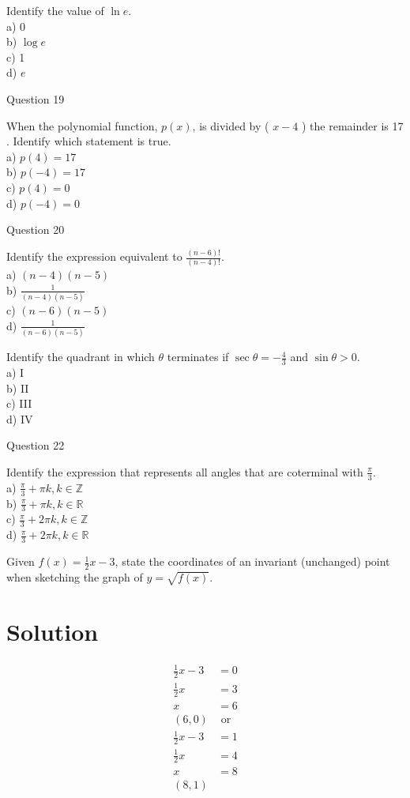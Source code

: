 \documentclass[10pt]{article}
\begin{document}
Identify the value of $\ln e$.\\
a) 0\\
b) $\log e$\\
c) 1\\
d) $e$

Question 19

When the polynomial function, $p(x)$, is divided by ( $x-4$ ) the remainder is 17 . Identify which statement is true.\\
a) $p(4)=17$\\
b) $p(-4)=17$\\
c) $p(4)=0$\\
d) $p(-4)=0$

Question 20

Identify the expression equivalent to $\frac{(n-6)!}{(n-4)!}$.\\
a) $(n-4)(n-5)$\\
b) $\frac{1}{(n-4)(n-5)}$\\
c) $(n-6)(n-5)$\\
d) $\frac{1}{(n-6)(n-5)}$

Identify the quadrant in which $\theta$ terminates if $\sec \theta=-\frac{4}{3}$ and $\sin \theta>0$.\\
a) I\\
b) II\\
c) III\\
d) IV

Question 22

Identify the expression that represents all angles that are coterminal with $\frac{\pi}{3}$.\\
a) $\frac{\pi}{3}+\pi k, k \in \mathbb{Z}$\\
b) $\frac{\pi}{3}+\pi k, k \in \mathbb{R}$\\
c) $\frac{\pi}{3}+2 \pi k, k \in \mathbb{Z}$\\
d) $\frac{\pi}{3}+2 \pi k, k \in \mathbb{R}$

Given $f(x)=\frac{1}{2} x-3$, state the coordinates of an invariant (unchanged) point when sketching the graph of $y=\sqrt{f(x)}$.

\section*{Solution}
$$
\begin{aligned}
\frac{1}{2} x-3 & =0 \\
\frac{1}{2} x & =3 \\
x & =6 \\
(6,0) & \text { or } \\
\frac{1}{2} x-3 & =1 \\
\frac{1}{2} x & =4 \\
x & =8 \\
(8,1) &
\end{aligned}
$$
\end{document}
